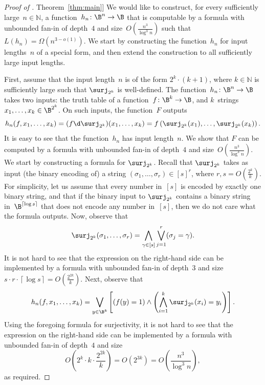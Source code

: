 \documentclass[11pt]{article}
\numberwithin{equation}{section}
\theoremstyle{definition}
\theoremstyle{plain}
\newcommand{\N}{\mathbb N}
\newcommand{\expref}[2]{\hyperref[#2]{#1~\ref{#2}}}
\theoremstyle{definition}\newtheorem{notation}[theorem]{Notation}\theoremstyle{plain}
\begin{document}
\begin{proof}[Proof of \expref{Theorem}{thm:main}]
We would like to construct, for every sufficiently large~$n\in\N$,
a function~$h_{n}\colon\B^{n}\to\B$ that is computable by a formula
with unbounded fan-in of depth~$4$ and size~$O(\frac{n^{3}}{\log^{3}n})$
such that $L(h_{n})=\Omega(n^{3-o(1)})$. We start by constructing
the function~$h_{n}$ for input lengths~$n$ of a special form,
and then extend the construction to all sufficiently large input lengths.

First, assume that the input length~$n$ is of the form $2^{k}\cdot(k+1)$,
where $k\in\N$ is sufficiently large such that $\surj_{2^{k}}$ is
well-defined. The function~$h_{n}\colon\B^{n}\to\B$ takes two inputs:
the truth table of a function~$f\colon\B^{k}\to\B$, and $k$~strings
$x_{1},\ldots,x_{k}\in\B^{2^{k}}$. On such inputs, the function~$F$
outputs 
\[
h_{n}(f,x_{1},\ldots,x_{k})=(f\d\surj_{2^{k}})(x_{1},\ldots,x_{k})=f\left(\surj_{2^{k}}(x_{1}),\ldots,\surj_{2^{k}}(x_{k})\right).
\]
It is easy to see that the function~$h_{n}$ has input length~$n$.
We show that $F$ can be computed by a formula with unbounded fan-in
of depth~$4$ and size~$O(\frac{n^{3}}{\log^{3}n})$. We start by
constructing a formula for $\surj_{2^{k}}$. Recall that $\surj_{2^{k}}$
takes as input (the binary encoding of) a string $(\sigma_{1},\ldots,\sigma_{r})\in\left[s\right]^{r}$,
where $r,s=O(\frac{2^{k}}{k})$. For simplicity, let us assume that
every number in~$\left[s\right]$ is encoded by exactly one binary
string, and that if the binary input to $\surj_{2^{k}}$ contains
a binary string in~$\B^{\left\lceil \log s\right\rceil }$ that does
not encode any number in~$\left[s\right]$, then we do not care what
the formula outputs. Now, observe that 
\begin{equation}
\surj_{2^{k}}(\sigma_{1},\ldots,\sigma_{r})=\bigwedge_{\gamma\in\left[s\right]}\bigvee_{j=1}^{r}(\sigma_{j}=\gamma).\label{eq:surjectivity-formula}
\end{equation}
It is not hard to see that the expression on the right-hand side can
be implemented by a formula with unbounded fan-in of depth~$3$ and
size $s\cdot r\cdot\left\lceil \log s\right\rceil =O\!\left(\frac{2^{2k}}{k}\right)$.
Next, observe that 
\[
h_{n}(f,x_{1},\ldots,x_{k})=\bigvee_{y\in\B^{k}}\left[\left(f(y)=1\right)\wedge\left(\bigwedge_{i=1}^{k}\surj_{2^{k}}(x_{i})=y_{i}\right)\right].
\]
Using the foregoing formula for surjectivity, it is not hard to see
that the expression on the right-hand side can be implemented by a
formula with unbounded fan-in of depth~$4$ and size 
\[
O\!\left(2^{k}\cdot k\cdot\frac{2^{2k}}{k}\right)=O\!\left(2^{3k}\right)=O\!\left(\frac{n^{3}}{\log^{3}n}\right),
\]
as required.


\end{proof}
\end{document}

